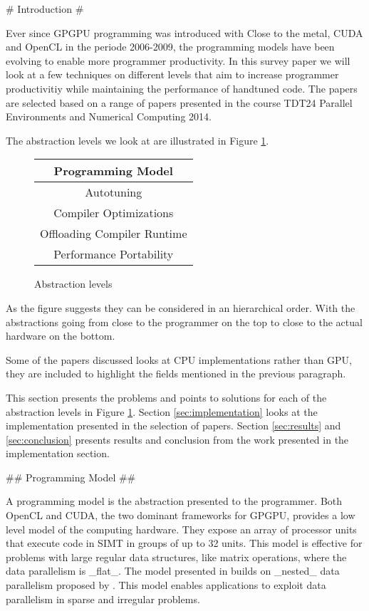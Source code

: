 \begin{markdown}

# Introduction #

Ever since GPGPU programming was introduced with Close to the metal,
CUDA\cite{CUDA} and OpenCL\cite{opencl} in the periode 2006-2009, the
programming models have been evolving to enable more programmer
productivity.  In this survey paper we will look at a few techniques
on different levels that aim to increase programmer productivitiy
while maintaining the performance of handtuned code. The papers are
selected based on a range of papers presented in the course TDT24
Parallel Environments and Numerical Computing 2014.

The abstraction levels we look at are illustrated in Figure
\ref{fig:abstraction}.

\begin{figure}[H]
  \centering
  \begin{tabular}{|c|}
    \hline
    Programming Model \\
    \hline \hline
    Autotuning \\
    \hline \hline
    Compiler Optimizations \\
    \hline \hline
    Offloading Compiler Runtime \\
    \hline \hline
    Performance Portability \\
    \hline
  \end{tabular}
  \caption{Abstraction levels}
  \label{fig:abstraction}
\end{figure}

As the figure suggests they can be considered in an hierarchical
order. With the abstractions going from close to the programmer on the
top to close to the actual hardware on the bottom. 

Some of the papers discussed looks at CPU implementations rather than
GPU, they are included to highlight the fields mentioned in the previous
paragraph.

This section presents the problems and points to solutions for each of
the abstraction levels in Figure \ref{fig:abstraction}. Section
\ref{sec:implementation} looks at the implementation presented in the
selection of papers. Section \ref{sec:results} and \ref{sec:conclusion}
presents results and conclusion from the work presented in the
implementation section. 

## Programming Model ##

A programming model is the abstraction presented to the programmer.
Both OpenCL and CUDA, the two dominant frameworks for GPGPU, provides
a low level model of the computing hardware. They expose an array of
processor units that execute code in SIMT in groups of up to 32
units. This model is effective for problems with large regular data
structures, like matrix operations, where the data parallelism is
_flat_. The model presented in \cite{DPH} builds on _nested_
data parallelism proposed by \cite{nesl}. This model enables
applications to exploit data parallelism in sparse and irregular
problems.


\end{markdown}
